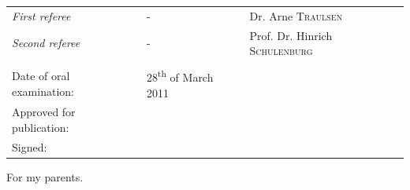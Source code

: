 \documentclass[oneside,11pt,a4paper]{book}
\begin{document}
\newpage
\thispagestyle{plain}
\renewcommand{\thepage}{\roman{page}}
\begin{center}
\vspace*{12cm}
\begin{center}
\begin{tabular}{lll}
      \textit{First referee }& - &Dr. Arne \textsc{Traulsen}	 \\
          \textit{Second referee }& - & Prof. Dr. Hinrich \textsc{Schulenburg}\\ \\
  Date of oral examination:	& 	28\textsuperscript{th} of March 2011					\\
  Approved for publication:	& 							\\
  Signed:	& 							\\
\end{tabular}
\end{center}
\end{center}

\newpage
\thispagestyle{plain}
\renewcommand{\thepage}{\roman{page}}
\begin{center}
\vspace*{5cm}

\large{For my parents.}
\end{center}

\tableofcontents
\renewcommand{\thepage}{\roman{page}}
\end{document}
